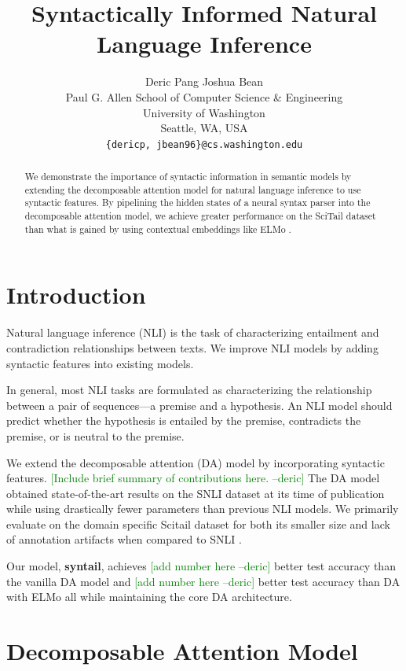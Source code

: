 \documentclass[11pt,a4paper]{article}
\title{Syntactically Informed Natural Language Inference}
\author{
  Deric Pang \quad
  Joshua Bean \\
  Paul G. Allen School of Computer Science \& Engineering \\
  University of Washington \\
  Seattle, WA, USA \\
  {\tt \{dericp, jbean96\}@cs.washington.edu} \\
}
\date{}
\newcommand{\dpcomment}[1]{\textcolor{green}{[#1 --deric]}}
\begin{document}
\maketitle
\begin{abstract}
We demonstrate the importance of syntactic information in semantic models by extending the
decomposable attention model \citep{Parikh2016-em} for natural language inference
to use syntactic features.
By pipelining the hidden states of a neural syntax parser into the decomposable
attention model, we achieve greater performance on the SciTail dataset
\citep{Khot2018-th} than what is gained by
using contextual embeddings like ELMo \citep{Peters2018-fz}.
\end{abstract}

\section{Introduction}

Natural language inference (NLI) is the task of characterizing entailment and
contradiction relationships between texts. We improve NLI models by adding syntactic
features into existing models.

In general, most NLI tasks are formulated as characterizing the relationship
between a pair of sequences---a premise and a hypothesis. An NLI model should
predict whether the hypothesis is entailed by the premise, contradicts the
premise, or is neutral to the premise.

We extend the decomposable attention (DA) model by \citet{Parikh2016-em}
incorporating syntactic features.
\dpcomment{Include brief summary of contributions here.}
The DA model obtained state-of-the-art results on the
SNLI \citep{Bowman2015-is} dataset at its time of publication while using
drastically fewer parameters than previous NLI models.
We primarily
evaluate on the domain specific Scitail dataset \citep{Khot2018-th}
for both its smaller size and lack of annotation artifacts when compared to SNLI
\citep{Gururangan2018-lj}.

Our model, \textbf{syntail}, achieves \dpcomment{add number here} better 
test accuracy than the vanilla
DA model and \dpcomment{add number here} better test accuracy than DA with ELMo all
while maintaining the core DA architecture.

\section{Decomposable Attention Model}
\end{document}
